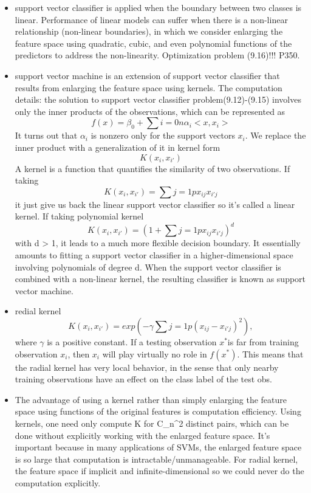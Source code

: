 \documentclass[a4paper, 12pt]{article}
\begin{document}
\begin{itemize}
	\item support vector classifier is applied when the boundary between two classes is linear. Performance of linear models can suffer when there is a non-linear relationship (non-linear boundaries), in which we consider enlarging the feature space using  quadratic, cubic, and even polynomial functions of the predictors to address the non-linearity. Optimization problem (9.16)!!! P350.
	\item support vector machine is an extension of support vector classifier that results from enlarging the feature space using kernels. The computation details:  the solution to support vector classifier problem(9.12)-(9.15) involves only the inner products of the observations, which can be represented as 
	\[
	f(x)=\beta_0 +\sum{i=0}{n} \alpha_i<x,x_i>
	\]
It turns out that $\alpha_i$ is nonzero only for the support vectors $x_i$. We replace the inner product with a generalization of it in kernel form
\[
K(x_i,x_{i'})
\]
A kernel is a function that quantifies the similarity of two observations. If taking 
\[
K(x_i,x_{i'})=\sum{j=1}{p}x_{ij}x_{i'j}
\]
it just give us back the linear support vector classifier so it's called a linear kernel. If taking polynomial kernel
\[
K(x_i,x_{i'})=(1+\sum{j=1}{p}x_{ij}x_{i'j})^d
\]
with d > 1, it leads to a much more flexible decision boundary. It essentially amounts to fitting a support vector classifier in a higher-dimensional space involving polynomials of degree d. When the support vector classifier is combined with a non-linear kernel, the resulting classifier is known as support vector machine.
\item redial kernel 
\[ K(x_i,x_{i'})=exp(-\gamma \sum{j=1}{p}(x_{ij}-x_{i'j})^2),
\]
where $\gamma$ is a positive constant. If a testing observation $x^*$is far from training observation $x_i$, then $x_i$ will play virtually no role in $f(x^*)$. This means that the radial kernel has very local behavior, in the sense that only nearby training observations have an effect on the class label of the test obs.
\item The advantage of using a kernel rather than simply enlarging the feature space using functions of the original features is computation efficiency. Using kernels, one need only compute K for C_n^2 distinct pairs, which can be done without explicitly working with the enlarged feature space. It's important because in many applications of SVMs, the enlarged feature space is so large that computation is intractable/unmanageable. For radial kernel, the feature space if implicit and infinite-dimensional so we could never do the computation explicitly.
\end{itemize}
	
\end{document}
